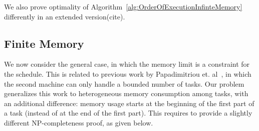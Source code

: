 \documentclass[sigconf]{acmart}
\begin{document}
	We also prove optimality of Algorithm~\ref{alg:OrderOfExecutionInfinteMemory} differently in an extended version(cite).
	\subsection{Finite Memory}
	
	We now consider the general case, in which the memory limit is a
	constraint for the schedule. This is related to previous work by
	Papadimitriou et. al~\cite{Papadimitriou:1980:FSL:322203.322213}, in which the second machine
	can only handle a bounded number of tasks. Our problem generalizes this
	work to heterogeneous memory consumption among tasks, with an
	additional difference: memory usage starts at the beginning of the
	first part of a task (instead of at the end of the first part). This
	requires to provide a slightly different NP-completeness proof, as
	given below.
	
\end{document}
